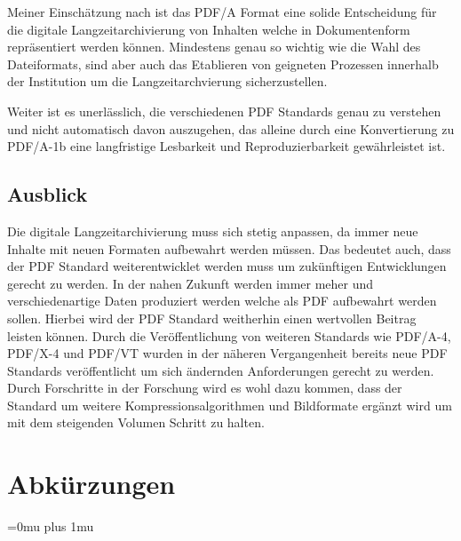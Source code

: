 \documentclass[a4paper,oneside, 12pt]{report}
\begin{document}
Meiner Einschätzung nach ist das PDF/A Format eine solide Entscheidung für die digitale Langzeitarchivierung von Inhalten welche in Dokumentenform repräsentiert werden können. Mindestens genau so wichtig wie die Wahl des Dateiformats, sind aber auch das Etablieren von geigneten Prozessen innerhalb der Institution um die Langzeitarchvierung sicherzustellen.

Weiter ist es unerlässlich, die verschiedenen PDF Standards genau zu verstehen und nicht automatisch davon auszugehen, das alleine durch eine Konvertierung zu PDF/A-1b eine langfristige Lesbarkeit und Reproduzierbarkeit gewährleistet ist.

\section{Ausblick}
Die digitale Langzeitarchivierung muss sich stetig anpassen, da immer neue Inhalte mit neuen Formaten aufbewahrt werden müssen. Das bedeutet auch, dass der PDF Standard weiterentwicklet werden muss um zukünftigen Entwicklungen gerecht zu werden. In der nahen Zukunft werden immer meher und verschiedenartige Daten produziert werden welche als PDF aufbewahrt werden sollen. Hierbei wird der PDF Standard weitherhin einen wertvollen Beitrag leisten können. Durch die Veröffentlichung von weiteren Standards wie PDF/A-4, PDF/X-4 und PDF/VT wurden in der näheren Vergangenheit bereits neue PDF Standards veröffentlicht um sich ändernden Anforderungen gerecht zu werden. Durch Forschritte in der Forschung wird es wohl dazu kommen, dass der Standard um weitere Kompressionsalgorithmen und Bildformate ergänzt wird um mit dem steigenden Volumen Schritt zu halten.


\cleardoublepage
{}
{}
\chapter*{Abkürzungen}
\begin{acronym}[Abkürzungen]
\end{acronym}

\cleardoublepage
{}
{}
\Urlmuskip=0mu plus 1mu\relax
\end{document}
